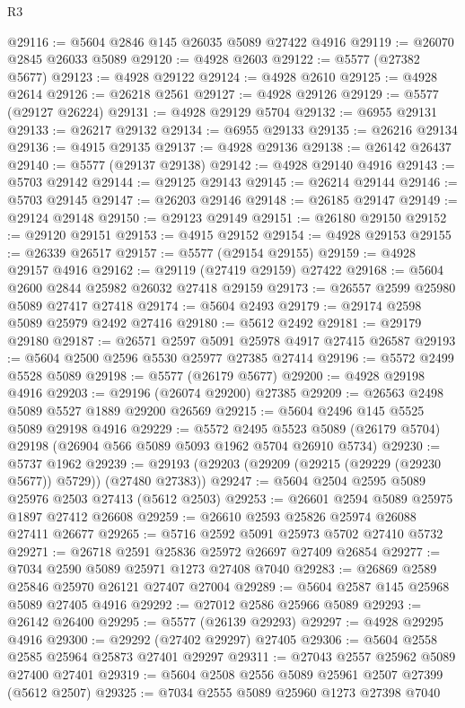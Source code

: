 \begin{lexlean}{R3}
\begin{coremodule}
@29116 := @5604 @2846 @145 @26035 @5089 @27422 @4916
@29119 := @26070 @2845 @26033 @5089
@29120 := @4928 @2603
@29122 := @5577 (@27382 @5677)
@29123 := @4928 @29122
@29124 := @4928 @2610
@29125 := @4928 @2614
@29126 := @26218 @2561
@29127 := @4928 @29126
@29129 := @5577 (@29127 @26224)
@29131 := @4928 @29129 @5704
@29132 := @6955 @29131
@29133 := @26217 @29132
@29134 := @6955 @29133
@29135 := @26216 @29134
@29136 := @4915 @29135
@29137 := @4928 @29136
@29138 := @26142 @26437
@29140 := @5577 (@29137 @29138)
@29142 := @4928 @29140 @4916
@29143 := @5703 @29142
@29144 := @29125 @29143
@29145 := @26214 @29144
@29146 := @5703 @29145
@29147 := @26203 @29146
@29148 := @26185 @29147
@29149 := @29124 @29148
@29150 := @29123 @29149
@29151 := @26180 @29150
@29152 := @29120 @29151
@29153 := @4915 @29152
@29154 := @4928 @29153
@29155 := @26339 @26517
@29157 := @5577 (@29154 @29155)
@29159 := @4928 @29157 @4916
@29162 := @29119 (@27419 @29159) @27422
@29168 := @5604 @2600 @2844 @25982 @26032 @27418 @29159
@29173 := @26557 @2599 @25980 @5089 @27417 @27418
@29174 := @5604 @2493
@29179 := @29174 @2598 @5089 @25979 @2492 @27416
@29180 := @5612 @2492
@29181 := @29179 @29180
@29187 := @26571 @2597 @5091 @25978 @4917 @27415 @26587
@29193 := @5604 @2500 @2596 @5530 @25977 @27385 @27414
@29196 := @5572 @2499 @5528 @5089
@29198 := @5577 (@26179 @5677)
@29200 := @4928 @29198 @4916
@29203 := @29196 (@26074 @29200) @27385
@29209 := @26563 @2498 @5089 @5527 @1889 @29200 @26569
@29215 := @5604 @2496 @145 @5525 @5089 @29198 @4916
@29229 := @5572
    @2495
    @5523
    @5089
    (@26179 @5704)
    @29198
    (@26904 @566 @5089 @5093 @1962 @5704 @26910 @5734)
@29230 := @5737 @1962
@29239 := @29193 (@29203 (@29209 (@29215 (@29229 (@29230 @5677)) @5729)) (@27480 @27383))
@29247 := @5604 @2504 @2595 @5089 @25976 @2503 @27413 (@5612 @2503)
@29253 := @26601 @2594 @5089 @25975 @1897 @27412 @26608
@29259 := @26610 @2593 @25826 @25974 @26088 @27411 @26677
@29265 := @5716 @2592 @5091 @25973 @5702 @27410 @5732
@29271 := @26718 @2591 @25836 @25972 @26697 @27409 @26854
@29277 := @7034 @2590 @5089 @25971 @1273 @27408 @7040
@29283 := @26869 @2589 @25846 @25970 @26121 @27407 @27004
@29289 := @5604 @2587 @145 @25968 @5089 @27405 @4916
@29292 := @27012 @2586 @25966 @5089
@29293 := @26142 @26400
@29295 := @5577 (@26139 @29293)
@29297 := @4928 @29295 @4916
@29300 := @29292 (@27402 @29297) @27405
@29306 := @5604 @2558 @2585 @25964 @25873 @27401 @29297
@29311 := @27043 @2557 @25962 @5089 @27400 @27401
@29319 := @5604 @2508 @2556 @5089 @25961 @2507 @27399 (@5612 @2507)
@29325 := @7034 @2555 @5089 @25960 @1273 @27398 @7040

\end{coremodule}
\end{lexlean}
